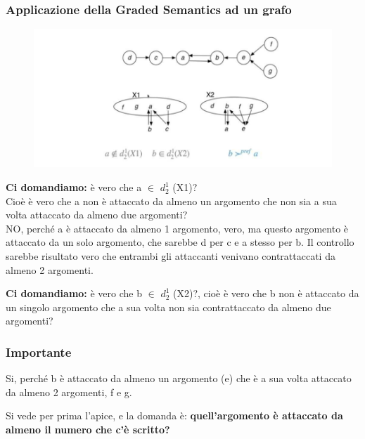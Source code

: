     \subsubsection{Applicazione della Graded Semantics ad un grafo}
    \begin{figure}[H]
        \centering
        \includegraphics[width=12cm, keepaspectratio]{img/Cap8/GdefnseGrafo.png}
    \end{figure}
    \textbf{Ci domandiamo:} è vero che a $\in$ $d^1_2$ (X1)? \\Cioè è
    vero che a non è attaccato da almeno un argomento che non sia a sua volta
    attaccato da almeno due argomenti? \\NO, perché a è attaccato da almeno 1
    argomento, vero, ma questo argomento è attaccato da un solo argomento, che
    sarebbe d per c e a stesso per b. Il controllo sarebbe risultato vero che
    entrambi gli attaccanti venivano contrattaccati da almeno 2 argomenti.

    \vspace{0.4cm}

    \noindent \textbf{Ci domandiamo:} è vero che b $\in$ $d^1_2$ (X2)?, cioè è
    vero che b non è attaccato da un singolo argomento che a sua volta non sia
    contrattaccato da almeno due argomenti?

    \subsubsection{\textbf{Importante}} Si, perché b è attaccato da almeno un
    argomento (e) che è a sua volta attaccato da almeno 2 argomenti, f e g.

    \vspace{0.3cm}

    \noindent Si vede per prima l'apice, e la domanda è: \textbf{quell'argomento
        è attaccato da almeno il numero che c'è scritto?}

    \vspace{0.3cm}

